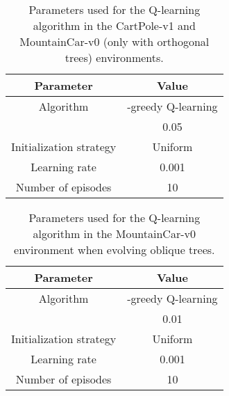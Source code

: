 \documentclass[review,english]{elsarticle}
\begin{document}
\begin{table}
    \centering
    \begin{tabular}{|c|c|} \hline
        \textbf{Parameter} & \textbf{Value} \\ \hline
        Algorithm & -greedy Q-learning \\  & 0.05 \\ Initialization strategy& Uniform  \\ Learning rate & 0.001 \\ Number of episodes & 10 \\ \hline
    \end{tabular}
    \caption{Parameters used for the Q-learning algorithm in the CartPole-v1 and MountainCar-v0 (only with orthogonal trees) environments.}
    \label{tab:cp_params_q}
    \label{tab:mc_ort_params_q}
\end{table}

\begin{table}
    \centering
    \begin{tabular}{|c|c|} \hline
        \textbf{Parameter} & \textbf{Value} \\ \hline
        Algorithm & -greedy Q-learning \\  & 0.01 \\ Initialization strategy& Uniform  \\ Learning rate & 0.001 \\ Number of episodes & 10 \\ \hline
    \end{tabular}
    \caption{Parameters used for the Q-learning algorithm in the MountainCar-v0 environment when evolving oblique trees.}
    \label{tab:mc_obl_params_q}
\end{table}
\end{document}
